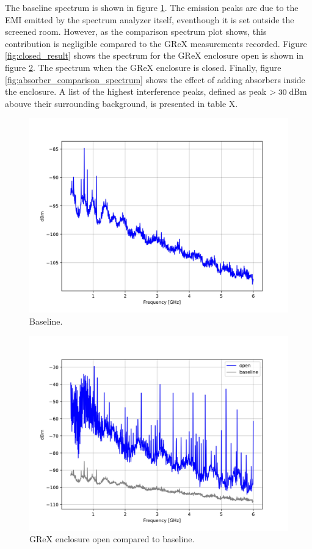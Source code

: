 \documentclass[12pt,a4paper,oneside]{article}
\begin{document}
The baseline spectrum is shown in figure \ref{fig:baseline_result}. The emission peaks are due to the EMI emitted by the spectrum analyzer itself, eventhough it is set outside the screened room. However, as the comparison spectrum plot shows, this contribution is negligible compared to the GReX measurements recorded. Figure \ref{fig:closed_result} shows the spectrum for the GReX enclosure open is shown in figure \ref{fig:open_result}. The spectrum when the GReX enclosure is closed. Finally, figure \ref{fig:absorber_comparison_spectrum} shows the effect of adding absorbers inside the enclosure. A list of the highest interference peaks, defined as peak $>30\thinspace$dBm abouve their surrounding background, is presented in table X.

\begin{figure}[H]
\centering
\includegraphics[width=1\linewidth]{Figures/baseline_spectrum.jpg}
\caption{Baseline.}
\label{fig:baseline_result}
\end{figure}

\begin{figure}[H]
\centering
\includegraphics[width=1\linewidth]{Figures/open_comparison_spectrum.jpg}
\caption{GReX enclosure open compared to baseline.}
\label{fig:open_result}
\end{figure}
\end{document}
